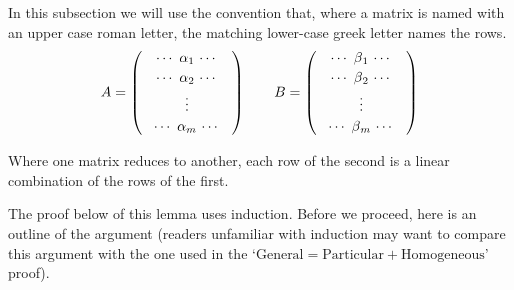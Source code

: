 In this subsection we will use the convention
that, where a matrix is named with an upper case roman letter,
the matching lower-case greek letter names the rows.
\begin{equation*}
  A=
    \begin{pmatrix}
      \makebox[2.25cm]{$\cdots$\ $\alpha_1$\ $\cdots$}   \\[.5ex]
      \makebox[2.25cm]{$\cdots$\ $\alpha_2$\ $\cdots$}   \\[.5ex]
      \vdots                                                     \\[.5ex]
      \makebox[2.25cm]{$\cdots$\ $\alpha_m$\ $\cdots$}   
    \end{pmatrix}
  \qquad
  B=
    \begin{pmatrix}
      \makebox[2.25cm]{$\cdots$\ $\smash[b]{\beta}_1$\ $\cdots$}  \\[.5ex]
      \makebox[2.25cm]{$\cdots$\ $\smash[b]{\beta}_2$\ $\cdots$}  \\[.5ex]
      \vdots                                                    \\[.5ex]
      \makebox[2.25cm]{$\cdots$\ $\smash[b]{\beta}_m$\ $\cdots$}  
    \end{pmatrix}
\end{equation*}

\begin{corollary} \label{cor:RowsOfEqMatsLinCombos}
Where one matrix reduces to another, each row of the second
is a linear combination of the rows of the first.
\end{corollary}

The proof below of this lemma
uses induction.
Before we proceed, here is an outline of the argument
(readers unfamiliar with induction may want to compare this argument with the
one used in the 
`$\text{General}=\text{Particular}+\text{Homogeneous}$' 
proof). %

